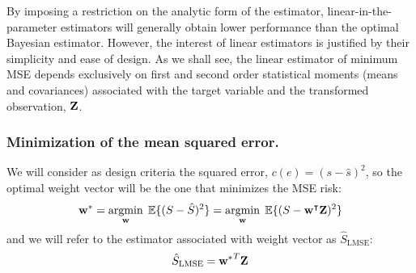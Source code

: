 
By imposing a restriction on the analytic form of the estimator, linear-in-the-parameter estimators will generally obtain lower performance than the optimal Bayesian estimator. However, the interest of linear estimators is justified by their simplicity and ease of design. As we shall see, the linear estimator of minimum MSE depends exclusively on first and second order statistical moments (means and covariances) {associated with the target variable and the transformed observation, ${\bf Z}$}.



\subsubsection{Minimization of the {mean squared error}.}%

We will consider as design criteria the squared error, $c(e) = (s-\hat s)^2$, so the optimal weight vector will be the one that minimizes the MSE risk:
{\begin{equation}
{\bf w}^* 
	= \operatorname*{argmin}_{\bf w} \; \mathbb{E}\{(S - \hat S)^2\} 
    = \operatorname*{argmin}_{\bf w}\;  \mathbb{E}\{(S - {\bf w}^\intercal {\bf Z})^2\}
\end{equation}
and we will refer to the estimator associated with weight vector as $\hat S_\text{LMSE}$: 
$$\hat S_\text{LMSE} = {{\bf w}^*}^T {\bf Z}$$}

